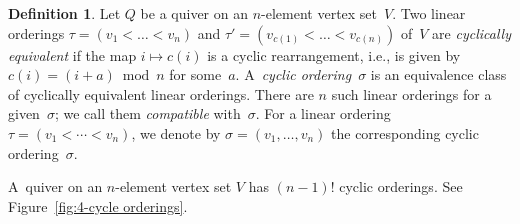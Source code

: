 \documentclass[11pt, letterpaper]{amsart}
\theoremstyle{definition}
\newtheorem{definition}[theorem]{Definition}
\numberwithin{equation}{section}
\begin{document}
\begin{definition} 
\label{def:cyclic ordering}
Let $Q$ be a quiver on an $n$-element vertex set~$V$. 
Two linear orderings $\tau=(v_1<\dots<v_n)$ and $\tau'=(v_{c(1)}<\dots<v_{c(n)})$ of~$V$ 
are \emph{cyclically equivalent} if the map $i\mapsto c(i)$ is a cyclic rearrangement, 
i.e., is given by $c(i)=(i+a)\bmod n$ for some~$a$. 
A~\emph{cyclic ordering}~$\sigma$ is an equivalence class of cyclically equivalent linear orderings. 
There are $n$ such linear orderings for a given~$\sigma$; 
we call them \emph{compatible} with~$\sigma$. 
For a linear ordering $\tau=(v_1<\cdots<v_n)$, we denote by 
$\sigma=(v_1,\dots, v_n)$ the corresponding cyclic ordering~$\sigma$. 

A~quiver on an $n$-element vertex set $V$ has $(n-1)!$ cyclic orderings. 
See Figure~\ref{fig:4-cycle orderings}. 
\end{definition}
\end{document}
